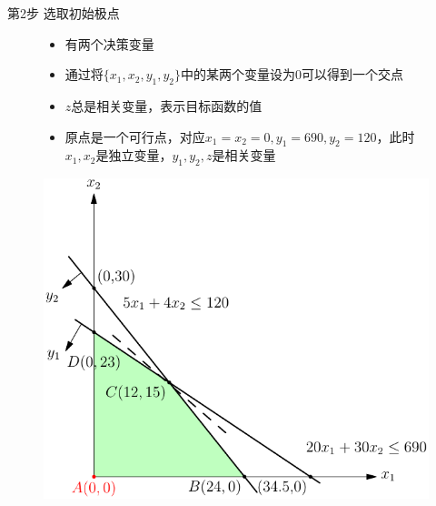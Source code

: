 \documentclass[UTF8]{ctexbeamer}
\begin{document}
\begin{frame}{第2步 选取初始极点}

  \begin{figure}
    \begin{minipage}{.5\linewidth}
      \begin{itemize}
      \item 有两个决策变量
      \item 通过将$\{x_1, x_2, y_1, y_2\}$中的某两个变量设为0可以得到一个交点
      \item $z$总是相关变量，表示目标函数的值
      \item 原点是一个可行点，对应$x_1=x_2=0, y_1=690, y_2=120$，此时$x_1, x_2$是独立变量，$y_1, y_2, z$是相关变量
      \end{itemize}
    \end{minipage}%
    \begin{minipage}{.5\linewidth}
      \includegraphics[width=\textwidth{}]{simplex-init.pdf}
    \end{minipage}
  \end{figure}

  
\end{frame}
\end{document}
